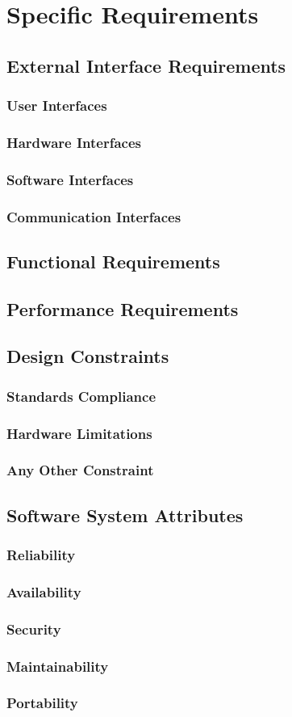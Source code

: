 
\section{Specific Requirements}\label{sec:spec_req}
\subsection{External Interface Requirements}
\subsubsection{User Interfaces}
\subsubsection{Hardware Interfaces}
\subsubsection{Software Interfaces}
\subsubsection{Communication Interfaces}
\subsection{Functional Requirements}
\subsection{Performance Requirements}
\subsection{Design Constraints}
\subsubsection{Standards Compliance}
\subsubsection{Hardware Limitations}
\subsubsection{Any Other Constraint}
\subsection{Software System Attributes}
\subsubsection{Reliability}
\subsubsection{Availability}
\subsubsection{Security}
\subsubsection{Maintainability}
\subsubsection{Portability}